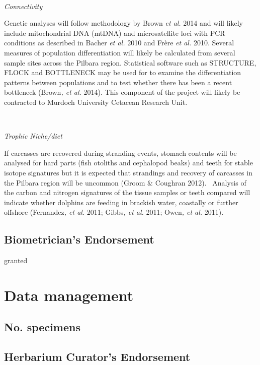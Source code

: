 \documentclass[version=last,
    paper=a4,                               %
    10pt,                                   %
    dvipsnames,
    oneside,                              %
    headings=openany,                       %
    open=any,
    BCOR=7mm,                               %
    DIV=15,     %
]{scrbook}
\begin{document}
~

\emph{Connectivity}

Genetic analyses will follow methodology by Brown \emph{et al.} 2014 and
will likely include mitochondrial DNA (mtDNA) and microsatellite loci
with PCR conditions as described in Bacher \emph{et al.} 2010 and Frère
\emph{et al.} 2010. Several measures of population differentiation will
likely be calculated from several sample sites across the Pilbara
region. Statistical software such as STRUCTURE, FLOCK and BOTTLENECK may
be used for to examine the differentiation patterns between populations
and to test whether there has been a recent bottleneck (Brown\emph{, et
al.} 2014). This component of the project will likely be contracted to
Murdoch University Cetacean Research Unit.

~

\emph{Trophic Niche/diet}

If carcasses are recovered during stranding events, stomach contents
will be analysed for hard parts (fish otoliths and cephalopod beaks) and
teeth for stable isotope signatures but it is expected that strandings
and recovery of carcasses in the Pilbara region will be uncommon (Groom
\& Coughran 2012).~ Analysis of the carbon and nitrogen signatures of
the tissue samples or teeth compared will indicate whether dolphins are
feeding in brackish water, coastally or further offshore
(Fernandez\emph{, et al.} 2011; Gibbs\emph{, et al.} 2011; Owen\emph{,
et al.} 2011).




\subsection*{Biometrician's Endorsement}

granted



\section*{Data management}


\subsection*{No. specimens}






\subsection*{Herbarium Curator's Endorsement}
\end{document}
